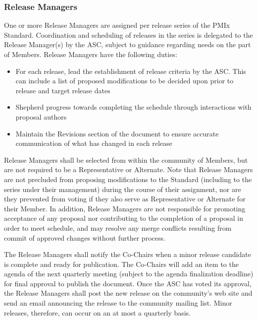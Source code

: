\documentclass{article}
\providecommand{\tightlist}{%
  \setlength{\itemsep}{0pt}\setlength{\parskip}{0pt}}
\begin{document}
\hypertarget{release-managers}{%
\subsubsection{Release Managers}\label{release-managers}}

One or more Release Managers are assigned per release series of the PMIx
Standard. Coordination and scheduling of releases in the series is
delegated to the Release Manager(s) by the ASC, subject to guidance
regarding needs on the part of Members. Release Managers have the
following duties:

\begin{itemize}
\tightlist
\item
  For each release, lead the establishment of release criteria by the
  ASC. This can include a list of proposed modifications to be decided
  upon prior to release and target release dates
\item
  Shepherd progress towards completing the schedule through interactions
  with proposal authors
\item
  Maintain the Revisions section of the document to ensure accurate
  communication of what has changed in each release
\end{itemize}

Release Managers shall be selected from within the community of Members,
but are not required to be a Representative or Alternate. Note that
Release Managers are not precluded from proposing modifications to the
Standard (including to the series under their management) during the
course of their assignment, nor are they prevented from voting if they
also serve as Representative or Alternate for their Member. In addition,
Release Managers are not responsible for promoting acceptance of any
proposal nor contributing to the completion of a proposal in order to
meet schedule, and may resolve any merge conflicts resulting from commit
of approved changes without further process.

The Release Managers shall notify the Co-Chairs when a minor release
candidate is complete and ready for publication. The Co-Chairs will add
an item to the agenda of the next quarterly meeting (subject to the
agenda finalization deadline) for final approval to publish the document. Once the ASC
has voted its approval, the Release Managers shall post the new release
on the community's web site and send an email announcing the release to
the community mailing list. Minor releases, therefore, can occur on an
at most a quarterly basis.
\end{document}
